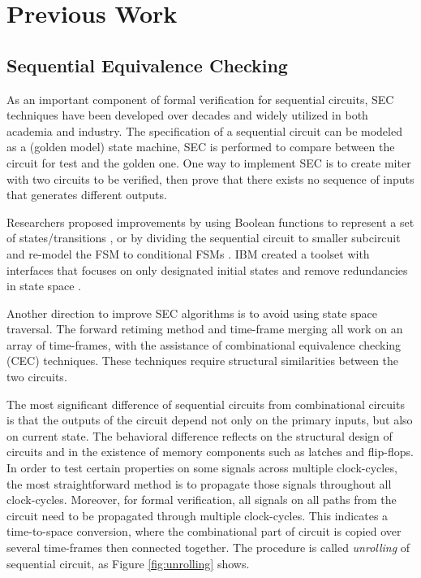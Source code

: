 \chapter{Previous Work}
\label{ch:prev}
\section{Sequential Equivalence Checking}
As an important component of formal verification for sequential circuits, SEC techniques 
have been developed over decades and widely utilized in both academia and industry. 
The specification of a sequential circuit can be modeled as a (golden model) state machine,
SEC is performed to compare between the circuit for test and the golden one.
One way to implement SEC is to create miter with two circuits to be verified, then 
prove that there exists no sequence of inputs that generates different outputs.

Researchers proposed improvements by using Boolean functions to represent 
a set of states/transitions \cite{coudert2003unified, coudert1990verification},  or by dividing the sequential circuit to 
smaller subcircuit and re-model the FSM to conditional FSMs \cite{khasidashvili2004theoretical}. IBM created a toolset with 
interfaces that focuses on only designated initial states and remove redundancies in state space \cite{baumgartner2007scalable}.

Another direction to improve SEC algorithms is to avoid using state space traversal. 
The forward retiming method \cite{van1998sequential} and time-frame merging \cite{stoffel1997record} 
all work on an array of time-frames,  with the assistance of combinational equivalence checking (CEC)
techniques. These techniques require structural similarities between the two circuits.

The most significant difference of sequential circuits from combinational circuits is 
that the outputs of the circuit depend not only 
on the primary inputs, but also on current state. 
The behavioral difference reflects on the structural design of circuits and in 
the existence of memory components such as latches and flip-flops.
In order to test certain properties on some signals across multiple clock-cycles,
the most straightforward method is to propagate those signals throughout 
all clock-cycles. Moreover, for formal verification, all signals on all paths from the circuit
need to be propagated through multiple clock-cycles.
This indicates a time-to-space conversion, where 
 the combinational part of circuit
is copied over several time-frames then connected together.
The procedure is called {\it unrolling} of sequential circuit, as 
Figure \ref{fig:unrolling} shows.


